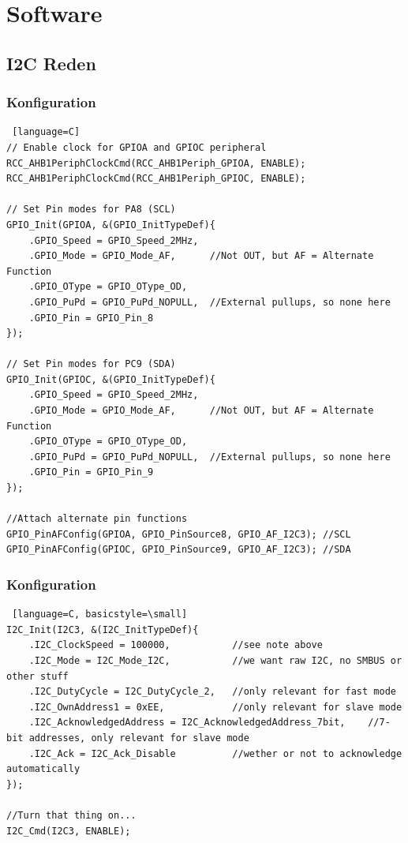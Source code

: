 \documentclass[ngerman,compress]{beamer}
\begin{document}
\section{Software}

\subsection{I2C Reden}

\begin{frame} [fragile]
	\frametitle{Konfiguration}
	\begin{lstlisting} [language=C]
// Enable clock for GPIOA and GPIOC peripheral
RCC_AHB1PeriphClockCmd(RCC_AHB1Periph_GPIOA, ENABLE);
RCC_AHB1PeriphClockCmd(RCC_AHB1Periph_GPIOC, ENABLE);

// Set Pin modes for PA8 (SCL)
GPIO_Init(GPIOA, &(GPIO_InitTypeDef){
    .GPIO_Speed = GPIO_Speed_2MHz,
    .GPIO_Mode = GPIO_Mode_AF,		//Not OUT, but AF = Alternate Function
    .GPIO_OType = GPIO_OType_OD,
    .GPIO_PuPd = GPIO_PuPd_NOPULL,	//External pullups, so none here
    .GPIO_Pin = GPIO_Pin_8
});

// Set Pin modes for PC9 (SDA)
GPIO_Init(GPIOC, &(GPIO_InitTypeDef){
    .GPIO_Speed = GPIO_Speed_2MHz,
    .GPIO_Mode = GPIO_Mode_AF,		//Not OUT, but AF = Alternate Function
    .GPIO_OType = GPIO_OType_OD,
    .GPIO_PuPd = GPIO_PuPd_NOPULL,	//External pullups, so none here
    .GPIO_Pin = GPIO_Pin_9
});

//Attach alternate pin functions
GPIO_PinAFConfig(GPIOA, GPIO_PinSource8, GPIO_AF_I2C3);	//SCL
GPIO_PinAFConfig(GPIOC, GPIO_PinSource9, GPIO_AF_I2C3);	//SDA
	\end{lstlisting}
\end{frame}

\begin{frame} [fragile]
	\frametitle{Konfiguration}
	\begin{lstlisting} [language=C, basicstyle=\small]
I2C_Init(I2C3, &(I2C_InitTypeDef){
    .I2C_ClockSpeed = 100000,			//see note above
    .I2C_Mode = I2C_Mode_I2C,			//we want raw I2C, no SMBUS or other stuff
    .I2C_DutyCycle = I2C_DutyCycle_2,	//only relevant for fast mode
    .I2C_OwnAddress1 = 0xEE,			//only relevant for slave mode
    .I2C_AcknowledgedAddress = I2C_AcknowledgedAddress_7bit,	//7-bit addresses, only relevant for slave mode
    .I2C_Ack = I2C_Ack_Disable			//wether or not to acknowledge automatically
});

//Turn that thing on...
I2C_Cmd(I2C3, ENABLE);
	\end{lstlisting}
\end{frame}
\end{document}
